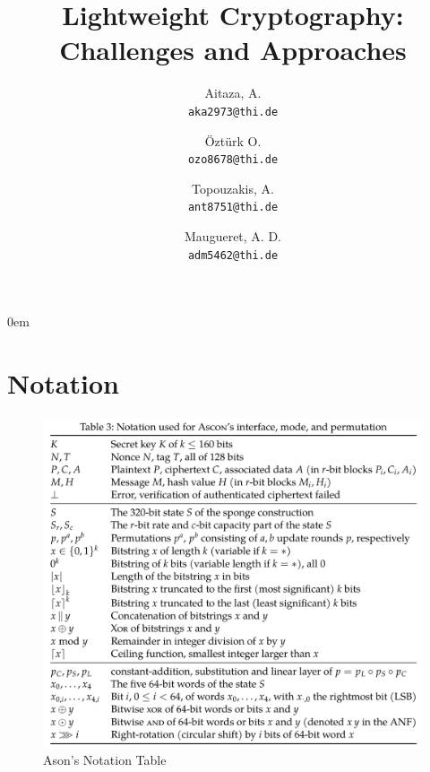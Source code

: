 \documentclass[a4paper]{article}
\begin{document}
\begin{titlepage}

  \title{ \Huge Lightweight Cryptography: Challenges and Approaches}
  \author{
    Aitaza, A. \\
    \texttt{aka2973@thi.de}
    \and
    Öztürk O.\\
    \texttt{ozo8678@thi.de}   
    \and
    Topouzakis, A. \\
    \texttt{ant8751@thi.de}
    \and
    Maugueret, A. D.\\
    \texttt{adm5462@thi.de}
    }
  \clearpage\maketitle
  \thispagestyle{empty}

\end{titlepage}

\restoregeometry

\newpage
\tableofcontents
\newpage
\listoffigures
\newpage
{} 

\topmargin-20mm
\hoffset-15mm
\textwidth15.5cm
\parindent0em

\thispagestyle{empty}
\section{Notation}

\begin{figure}[H] 
    \centering 
    \includegraphics[width=1\textwidth]{figures/ascon-notation.png}
    \caption{Ason's Notation Table \cite{Ascon-v1.2}}
    \label{fig:ascon-notation} 
  \end{figure}








\newpage
\printbibliography
\newpage


\end{document}
